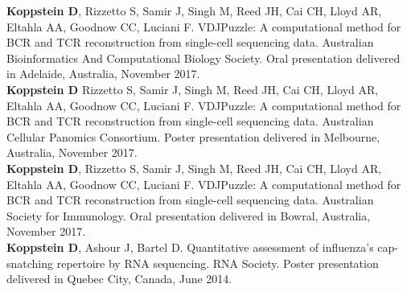 \documentclass[10pt,a4paper]{article}
\begin{document}
\spacedhrule{0.1em}{-0.2em}  %


{\noindent \textbf{Koppstein D}, Rizzetto S, Samir J, Singh M, Reed JH, Cai CH, Lloyd AR, Eltahla AA, Goodnow CC, Luciani F. VDJPuzzle: A computational method for BCR and TCR reconstruction from single-cell sequencing data. Australian Bioinformatics And Computational Biology Society. Oral presentation delivered in Adelaide, Australia, November 2017.} \vspace{-0.8em} \\

{\noindent \textbf{Koppstein D} Rizzetto S, Samir J, Singh M, Reed JH, Cai CH, Lloyd AR, Eltahla AA, Goodnow CC, Luciani F. VDJPuzzle: A computational method for BCR and TCR reconstruction from single-cell sequencing data. Australian Cellular Panomics Consortium. Poster presentation delivered in Melbourne, Australia, November 2017.} \vspace{-0.8em} \\

{\noindent \textbf{Koppstein D}, Rizzetto S, Samir J, Singh M, Reed JH, Cai CH, Lloyd AR, Eltahla AA, Goodnow CC, Luciani F. VDJPuzzle: A computational method for BCR and TCR reconstruction from single-cell sequencing data. Australian Society for Immunology. Oral presentation delivered in Bowral, Australia, November 2017.} \vspace{-0.8em} \\

{\noindent \textbf{Koppstein D}, Ashour J, Bartel D. Quantitative assessment of influenza's cap-snatching repertoire by RNA sequencing. RNA Society. Poster presentation delivered in Quebec City, Canada, June 2014.} \vspace{-0.8em} \\

\spacedhrule{0.3em}{-0.2em}  %

\end{document}
